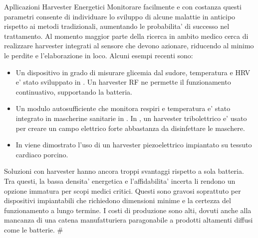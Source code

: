 \begin{multicols}{2}
\begin{section}{Apllicazioni Harvester Energetici}
    Monitorare facilmente e con costanza questi parametri consente di individuare lo sviluppo di alcune malattie in anticipo rispetto ai metodi tradizionali, aumentando le probabilita' di successo nel trattamento. Al momento maggior parte della ricerca in ambito medico cerca di realizzare harvester integrati al sensore che devono azionare, riducendo al minimo le perdite e l'elaborazione in loco. Alcuni esempi recenti sono: \begin{itemize}
        \item Un dispositivo in grado di misurare glicemia dal sudore, temperatura e HRV e' stato sviluppato in \cite{mirlouContinuousGlycemicMonitoring2024}. Un harvester RF ne permette il funzionamento continuativo, supportando la batteria.
        \item Un modulo autosufficiente che monitora respiri e temperatura e' stato integrato in mascherine sanitarie in \cite{lanHighefficientIntelligentAntibacterial2024}. In \cite{simInstantDisinfectingFace}, un harvester tribolettrico e' usato per creare un campo elettrico forte abbastanza da disinfettare le maschere.
        \item In \cite{PanVivoFlexibleEnergy2024} viene dimostrato l'uso di un harvester piezoelettrico impiantato su tessuto cardiaco porcino.
    \end{itemize}
 
    Soluzioni con harvester hanno ancora troppi svantaggi rispetto a sola batteria. Tra questi, la bassa densita' energetica e l'affidabilita' incerta li rendono un opzione immatura per scopi medici critici. Questi sono gravosi soprattuto per dispositivi impiantabili che richiedono dimensioni minime e la certezza del funzionamento a lungo termine. I costi di produzione sono alti, dovuti anche alla mancanza di una catena manufatturiera paragonabile a prodotti altamenti diffusi come le batterie. \#


\end{section}
\end{multicols}
